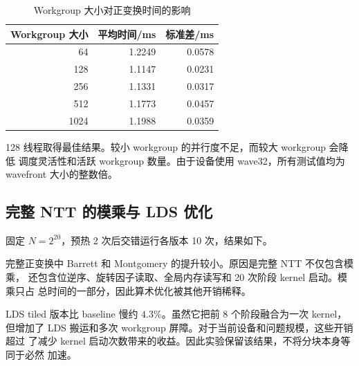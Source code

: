 ﻿\documentclass[a4paper]{article}
\begin{document}
\begin{table}[H]
  \centering
  \caption{Workgroup 大小对正变换时间的影响}
  \begin{tabular}{rrr}
    \toprule
    Workgroup 大小 & 平均时间/ms & 标准差/ms \\
    \midrule
    64   & 1.2249 & 0.0578 \\
    128  & 1.1147 & 0.0231 \\
    256  & 1.1331 & 0.0317 \\
    512  & 1.1773 & 0.0457 \\
    1024 & 1.1988 & 0.0359 \\
    \bottomrule
  \end{tabular}
\end{table}

128 线程取得最佳结果。较小 workgroup 的并行度不足，而较大 workgroup 会降低
调度灵活性和活跃 workgroup 数量。由于设备使用 wave32，所有测试值均为
wavefront 大小的整数倍。

\subsection{完整 NTT 的模乘与 LDS 优化}

固定 $N=2^{20}$，预热 2 次后交错运行各版本 10 次，结果如下。

\begin{table}[H]
  \centering
  \caption{完整 NTT 的不同 GPU 实现}
  \footnotesize
  \setlength{\tabcolsep}{2pt}
\end{table}

完整正变换中 Barrett 和 Montgomery 的提升较小。原因是完整 NTT 不仅包含模乘，
还包含位逆序、旋转因子读取、全局内存读写和 20 次阶段 kernel 启动。模乘只占
总时间的一部分，因此算术优化被其他开销稀释。

LDS tiled 版本比 baseline 慢约 $4.3\%$。虽然它把前 8 个阶段融合为一次 kernel，
但增加了 LDS 搬运和多次 workgroup 屏障。对于当前设备和问题规模，这些开销超过
了减少 kernel 启动次数带来的收益。因此实验保留该结果，不将分块本身等同于必然
加速。
\end{document}
